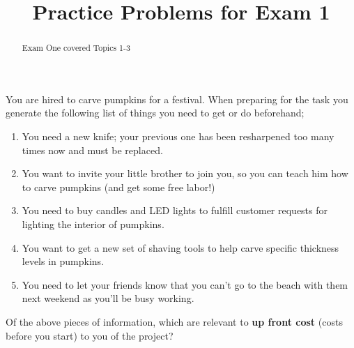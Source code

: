 \documentclass{ximera}
\title{Practice Problems for Exam 1}
\begin{document}
\begin{abstract}
Exam One covered Topics 1-3
\end{abstract}
\maketitle





\begin{problem}
    You are hired to carve pumpkins for a festival. When preparing for the task you generate the following list of things you need to get or do beforehand;
    \begin{enumerate}
        \item You need a new knife; your previous one has been resharpened too many times now and must be replaced.
        \item You want to invite your little brother to join you, so you can teach him how to carve pumpkins (and get some free labor!)
        \item You need to buy candles and LED lights to fulfill customer requests for lighting the interior of pumpkins.
        \item You want to get a new set of shaving tools to help carve specific thickness levels in pumpkins.
        \item You need to let your friends know that you can't go to the beach with them next weekend as you'll be busy working.
    \end{enumerate}
    Of the above pieces of information, which are relevant to \textbf{up front cost} (costs before you start) to you of the project?
    \begin{selectAll}

\end{selectAll}
\end{problem}
\end{document}
